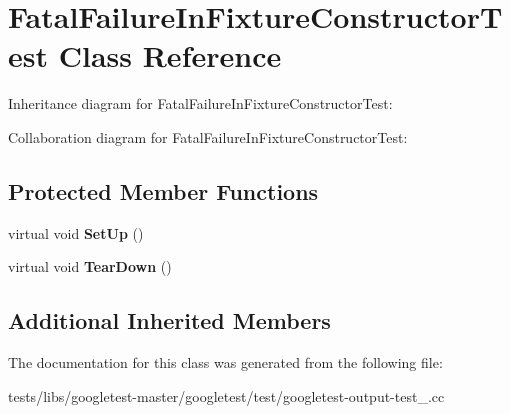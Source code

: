 \hypertarget{classFatalFailureInFixtureConstructorTest}{}\section{Fatal\+Failure\+In\+Fixture\+Constructor\+Test Class Reference}
\label{classFatalFailureInFixtureConstructorTest}


Inheritance diagram for Fatal\+Failure\+In\+Fixture\+Constructor\+Test\+:


Collaboration diagram for Fatal\+Failure\+In\+Fixture\+Constructor\+Test\+:
\subsection*{Protected Member Functions}
\begin{DoxyCompactItemize}
\item 
\mbox{\label{classFatalFailureInFixtureConstructorTest_a006d3ac0e7a4ad3c469c3b41dc7c42c3}} 
virtual void {\bfseries Set\+Up} ()
\item 
\mbox{\label{classFatalFailureInFixtureConstructorTest_a2763026a557e1fce4e59bd16c4eced57}} 
virtual void {\bfseries Tear\+Down} ()
\end{DoxyCompactItemize}
\subsection*{Additional Inherited Members}


The documentation for this class was generated from the following file\+:\begin{DoxyCompactItemize}
\item 
tests/libs/googletest-\/master/googletest/test/googletest-\/output-\/test\+\_\+.\+cc\end{DoxyCompactItemize}
